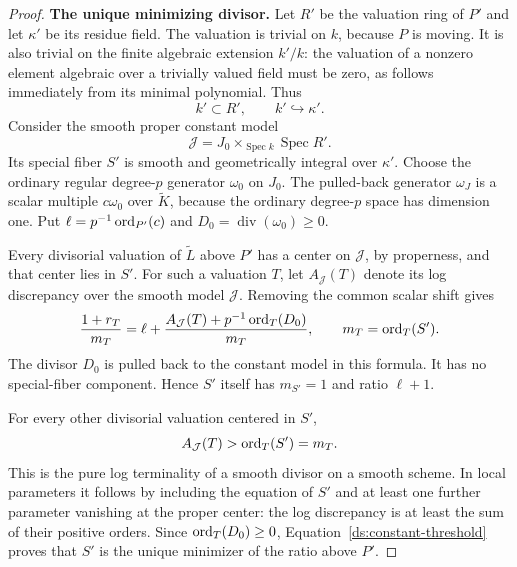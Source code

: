 \begin{proof}
\smallskip\noindent\textbf{The unique minimizing divisor.}\enspace
Let $R'$ be the valuation ring of $P'$ and let $\kappa'$ be its
residue field.  The valuation is trivial on $k$, because $P$ is
moving.  It is also trivial on the finite algebraic extension
$k'/k$: the valuation of a nonzero element algebraic over a
trivially valued field must be zero, as follows immediately from
its minimal polynomial.  Thus
\begin{equation}
 k'\subset R',\qquad k'\hookrightarrow\kappa'.
 \label{ds:constant-residue}
\end{equation}
Consider the smooth proper constant model
\[
 \mathcal J=J_0\times_{\operatorname{Spec}k}\operatorname{Spec}R'.
\]
Its special fiber $S'$ is smooth and geometrically integral over
$\kappa'$.  Choose the ordinary regular degree-$p$ generator
$\omega_0$ on $J_0$.  The pulled-back generator $\omega_J$ is a
scalar multiple $c\omega_0$ over $\widetilde K$, because the
ordinary degree-$p$ space has dimension one.  Put
$\ell=p^{-1}\operatorname{ord}_{P'}(c)$ and
$D_0=\operatorname{div}(\omega_0)\geq0$.

Every divisorial valuation of $\widetilde L$ above $P'$ has a
center on $\mathcal J$, by properness, and that center lies in
$S'$.  For such a valuation $T$, let $A_{\mathcal J}(T)$ denote its
log discrepancy over the smooth model $\mathcal J$.  Removing the
common scalar shift gives
\begin{equation}
 \frac{1+r_T}{m_T}
   =\ell+
     \frac{A_{\mathcal J}(T)+p^{-1}\operatorname{ord}_T(D_0)}{m_T},
 \qquad m_T=\operatorname{ord}_T(S').
 \label{ds:constant-threshold}
\end{equation}
The divisor $D_0$ is pulled back to the constant model in this
formula.  It has no special-fiber component.  Hence $S'$ itself
has $m_{S'}=1$ and ratio $\ell+1$.

For every other divisorial valuation centered in $S'$,
\[
 A_{\mathcal J}(T)>\operatorname{ord}_T(S')=m_T.
\]
This is the pure log terminality of a smooth divisor on a smooth
scheme.  In local parameters it follows by including the equation
of $S'$ and at least one further parameter vanishing at the proper
center: the log discrepancy is at least the sum of their positive
orders.  Since $\operatorname{ord}_T(D_0)\geq0$, Equation~\eqref{ds:constant-threshold}
proves that $S'$ is the unique
minimizer of the ratio above $P'$.


\end{proof}
